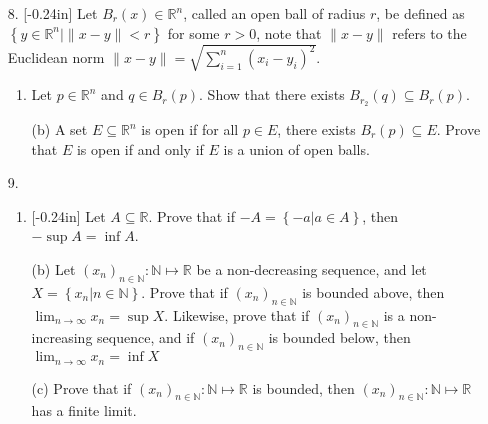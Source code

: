\documentclass[letterpaper,12pt]{article}
\newcommand{\set}[1]{\left\{ #1 \right\}}
\theoremstyle{definition}
\begin{document}
\pagebreak
\begin{enumerate}
    \item[8.] \reversemarginpar{}[-0.24in] 
 Let $B_r(x) \in \mathbb{R}^n$, called an open ball of radius $r$, be defined as $\set{y \in \mathbb{R}^n | \| x-y \| < r}$ for some $r > 0$, note that $\| x-y \|$ refers to the Euclidean norm $\| x-y \| = \sqrt{\sum_{i=1}^n (x_i - y_i)^2}$. \begin{enumerate}
        \item Let $p \in \mathbb{R}^n$ and $q \in B_r(p)$. Show that there exists $B_{r_2}(q) \subseteq B_r(p)$.
    \end{enumerate}
\end{enumerate}
\pagebreak
\begin{enumerate}
    \item[] \begin{enumerate}
        \item[(b)] A set $E \subseteq \mathbb{R}^n$ is open if for all $p \in E$, there exists $B_r(p) \subseteq E$. Prove that $E$ is open if and only if $E$ is a union of open balls.
    \end{enumerate}
\end{enumerate}
\pagebreak
\begin{enumerate}
    \item[9.] \begin{enumerate}
    \item\reversemarginpar{}[-0.24in]   Let $A \subseteq \mathbb{R}$. Prove that if $-A = \set{-a | a \in A}$, then $-\sup A = \inf A$. 
\end{enumerate}
\end{enumerate}
\pagebreak
\begin{enumerate}
   \item[] \begin{enumerate}
       \item[(b)] Let $(x_n)_{n\in\mathbb{N}} : \mathbb{N} \mapsto \mathbb{R}$ be a non-decreasing sequence, and let $X= \set{x_n | n \in \mathbb{N}}$. Prove that if $(x_n)_{n\in\mathbb{N}}$ is bounded above, then $\lim_{n \rightarrow \infty} x_n = \sup X$. Likewise, prove that if $(x_n)_{n\in\mathbb{N}}$ is a non-increasing sequence, and if $(x_n)_{n\in\mathbb{N}}$ is bounded below, then $\lim_{n \rightarrow \infty} x_n = \inf X$
   \end{enumerate}
\end{enumerate}
\pagebreak
\begin{enumerate}
    \item[] \begin{enumerate}
        \item[(c)] Prove that if $(x_n)_{n\in\mathbb{N}} : \mathbb{N} \mapsto \mathbb{R}$ is bounded, then $(x_n)_{n \in \mathbb{N}} : \mathbb{N} \mapsto \mathbb{R}$ has a finite limit.
    \end{enumerate}
\end{enumerate}
\end{document}
